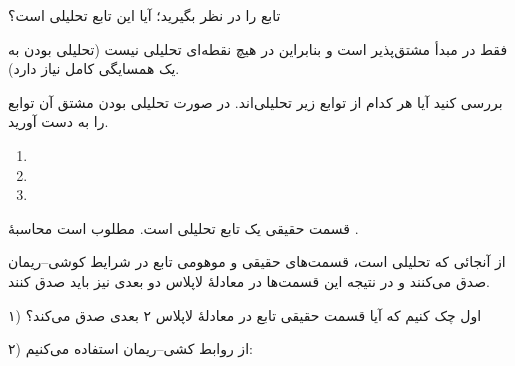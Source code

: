 \begin{EMexample}{}

تابع  را در نظر بگیرید؛ آیا این تابع تحلیلی است؟

فقط در مبدأ مشتق‌پذیر است و بنابراین در هیچ نقطه‌ای تحلیلی نیست (تحلیلی بودن به یک همسایگی کامل نیاز دارد).

\end{EMexample}

\begin{EMexercise}{}

بررسی کنید آیا هر کدام از توابع زیر تحلیلی‌اند. در صورت تحلیلی بودن مشتق آن توابع را به دست آورید.

\begin{enumerate}
\def\labelenumi{\arabic{enumi}.}
\tightlist
\item
\item
\item
\end{enumerate}

\end{EMexercise}

\EMhold


\begin{EMexample}{}

 قسمت حقیقی یک تابع تحلیلی  است. مطلوب است محاسبهٔ .

از آنجائی که  تحلیلی است، قسمت‌های حقیقی و موهومی تابع در شرایط کوشی--ریمان صدق می‌کنند و در نتیجه این قسمت‌ها در معادلهٔ لاپلاس دو بعدی نیز باید صدق کنند.

۱) اول چک کنیم که آیا قسمت حقیقی تابع در معادلهٔ لاپلاس ۲ بعدی صدق می‌کند؟

۲) از روابط کشی--ریمان استفاده می‌کنیم:

\end{EMexample}

